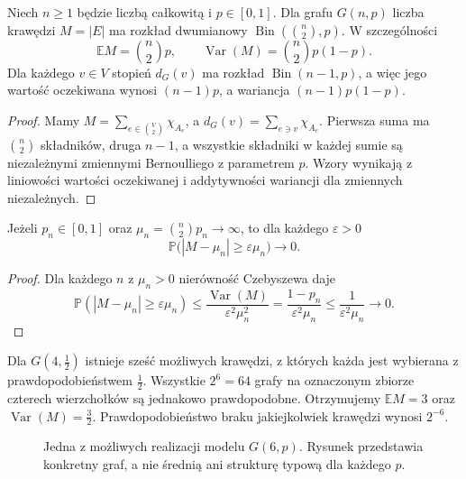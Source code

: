 \begin{stwierdzenie}
\label{prop:tg-random-edges-degrees}
Niech $n\geq1$ będzie liczbą całkowitą i $p\in[0,1]$.
Dla grafu $G(n,p)$
liczba krawędzi $M=|E|$
ma rozkład dwumianowy
$\operatorname{Bin}(\binom n2,p)$.
W szczególności
\[
\mathbb E M=\binom n2p,
\qquad
\operatorname{Var}(M)=\binom n2p(1-p).
\]
Dla każdego $v\in V$
stopień $d_G(v)$ ma rozkład
$\operatorname{Bin}(n-1,p)$,
a więc jego wartość oczekiwana
wynosi $(n-1)p$, a wariancja
$(n-1)p(1-p)$.
\end{stwierdzenie}
\begin{proof}
Mamy $M=\sum_{e\in\binom V2}\chi_{A_e}$,
a $d_G(v)=\sum_{e\ni v}\chi_{A_e}$.
Pierwsza suma ma $\binom n2$
składników, druga $n-1$,
a wszystkie składniki
w każdej sumie są niezależnymi
zmiennymi Bernoulliego
z parametrem $p$.
Wzory wynikają z liniowości
wartości oczekiwanej
i addytywności wariancji
dla zmiennych niezależnych.
\end{proof}

\begin{wniosek}
\label{cor:tg-random-edge-concentration}
Jeżeli $p_n\in[0,1]$ oraz
$\mu_n=\binom n2p_n\to\infty$,
to dla każdego $\varepsilon>0$
\[
\mathbb P\bigl(
|M-\mu_n|\geq\varepsilon\mu_n
\bigr)\longrightarrow0.
\]
\end{wniosek}
\begin{proof}
Dla każdego $n$ z $\mu_n>0$
nierówność Czebyszewa daje
\[
\mathbb P(|M-\mu_n|\geq\varepsilon\mu_n)
\leq\frac{\operatorname{Var}(M)}
{\varepsilon^2\mu_n^2}
=\frac{1-p_n}{\varepsilon^2\mu_n}
\leq\frac1{\varepsilon^2\mu_n}
\longrightarrow0.
\]
\end{proof}

\begin{przyklad}
\label{ex:tg-random-four}
Dla $G(4,\tfrac12)$ istnieje
sześć możliwych krawędzi,
z których każda jest wybierana
z prawdopodobieństwem $\tfrac12$.
Wszystkie $2^6=64$ grafy
na oznaczonym zbiorze
czterech wierzchołków
są jednakowo prawdopodobne.
Otrzymujemy $\mathbb EM=3$
oraz $\operatorname{Var}(M)=\tfrac32$.
Prawdopodobieństwo braku
jakiejkolwiek krawędzi
wynosi $2^{-6}$.
\end{przyklad}

\begin{figure}[htbp]
\centering
{}
\caption{Jedna z możliwych realizacji
modelu $G(6,p)$. Rysunek przedstawia
konkretny graf, a nie średnią
ani strukturę typową dla każdego $p$.}
\label{fig:tg-random-realization}
\end{figure}

